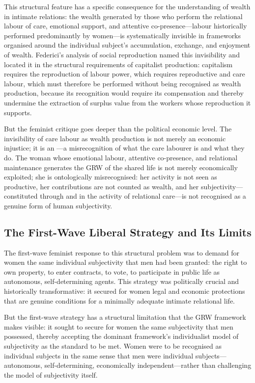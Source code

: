 This structural feature has a specific consequence for the understanding of wealth in intimate relations: the wealth generated by those who perform the relational labour of care, emotional support, and attentive co-presence---labour historically performed predominantly by women---is systematically invisible in frameworks organised around the individual subject's accumulation, exchange, and enjoyment of wealth. Federici's analysis of social reproduction \parencite{federici2004} named this invisibility and located it in the structural requirements of capitalist production: capitalism requires the reproduction of labour power, which requires reproductive and care labour, which must therefore be performed without being recognised as wealth production, because its recognition would require its compensation and thereby undermine the extraction of surplus value from the workers whose reproduction it supports.

But the feminist critique goes deeper than the political economic level. The invisibility of care labour as wealth production is not merely an economic injustice; it is an ---a misrecognition of what the care labourer is and what they do. The woman whose emotional labour, attentive co-presence, and relational maintenance generates the GRW of the shared life is not merely economically exploited; she is ontologically misrecognised: her activity is not seen as productive, her contributions are not counted as wealth, and her subjectivity---constituted through and in the activity of relational care---is not recognised as a genuine form of human subjectivity.

\subsection{The First-Wave Liberal Strategy and Its Limits}
\label{p15:subsec:firstwave}

\noindent
The first-wave feminist response to this structural problem was to demand for women the same individual subjectivity that men had been granted: the right to own property, to enter contracts, to vote, to participate in public life as autonomous, self-determining agents. This strategy was politically crucial and historically transformative: it secured for women legal and economic protections that are genuine conditions for a minimally adequate intimate relational life.

But the first-wave strategy has a structural limitation that the GRW framework makes visible: it sought to secure for women the same  subjectivity that men possessed, thereby accepting the dominant framework's individualist model of subjectivity as the standard to be met. Women were to be recognised as individual subjects in the same sense that men were individual subjects---autonomous, self-determining, economically independent---rather than challenging the model of subjectivity itself.


